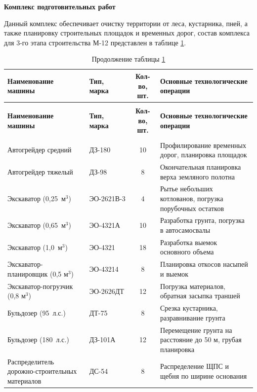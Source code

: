 \textbf{Комплекс подготовительных работ}

Данный комплекс обеспечивает очистку территории от леса, кустарника, пней, а также планировку строительных площадок и временных дорог, состав комплекса для 3-го этапа строительства М-12 представлен в таблице \ref{tab:prep_complex_qty}.

\begin{longtable}{|>{\raggedright\arraybackslash}p{3.8cm}|>{\raggedright\arraybackslash}p{3.2cm}|c|>{\raggedright\arraybackslash}p{5.0cm}|}
	\caption{Состав комплекса машин подготовительных работ} \label{tab:prep_complex_qty} \\
	\hline
	\textbf{Наименование машины} & \textbf{Тип, марка} & \textbf{Кол-во, шт.} & \textbf{Основные технологические операции} \\
	\hline
	\endfirsthead
	\caption*{Продолжение таблицы \ref{tab:prep_complex_qty}} \\
	\hline
	\textbf{Наименование машины} & \textbf{Тип, марка} & \textbf{Кол-во, шт.} & \textbf{Основные технологические операции} \\
	\hline
	\endhead
	\hline
	\multicolumn{4}{r}{\small Продолжение на следующей странице} \\
	\endfoot
	\hline
	\endlastfoot
	Автогрейдер средний & ДЗ-180 & 10 & Профилирование временных дорог, планировка площадок \\
	Автогрейдер тяжелый & ДЗ-98 & 8 & Окончательная планировка верха земляного полотна \\
	Экскаватор (0,25~м\(^3\)) & ЭО-2621В-3 & 4 & Рытье небольших котлованов, погрузка порубочных остатков \\
	Экскаватор (0,65~м\(^3\)) & ЭО-4321А & 10 & Разработка грунта, погрузка в автосамосвалы \\
	Экскаватор (1,0~м\(^3\)) & ЭО-4321 & 18 & Разработка выемок основного объема \\
	Экскаватор-планировщик (0,5 м\(^3\)) & ЭО-43214 & 8 & Планировка откосов насыпей и выемок \\
	Экскаватор-погрузчик (0,8 м\(^3\)) & ЭО-2626ДТ & 12 & Погрузка материалов, обратная засыпка траншей \\
	Бульдозер (95~л.с.) & ДТ-75 & 8 & Срезка кустарника, разравнивание грунта \\
	Бульдозер (180~л.с.) & ДЗ-101А & 12 & Перемещение грунта на расстояние до 50 м, грубая планировка \\
	Распределитель дорожно-строительных материалов & ДС-54 & 8 & Распределение ЩПС и щебня по ширине основания \\

\end{longtable}
